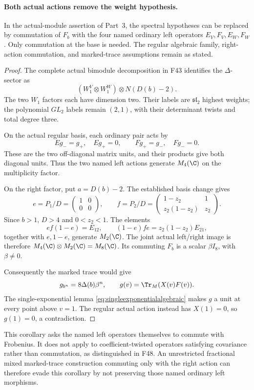 \documentclass[11pt,a4paper]{article}
\newcommand{\fid}[1]{\textsf{#1}}\newcommand{\gate}[1]{\textsf{#1}}
\theoremstyle{named}\newtheorem{finding}{Finding}[section]
\theoremstyle{definition}\newtheorem{definition}[finding]{Definition}
\theoremstyle{remark}\newtheorem{remark}[finding]{Remark}
\begin{document}
\paragraph{Both actual actions remove the weight hypothesis.}
In the actual-module assertion of Part~3, the spectral
hypotheses can be replaced by commutation of $F_b$
with the four named ordinary left operators
$E_V,F_V,E_W,F_W$.
Only commutation at the base is needed.
The regular algebraic family, right-action commutation,
and marked-trace assumptions remain as stated.

\begin{proof}
The complete actual bimodule decomposition in \fid{F43}
identifies the $\Delta$-sector as
\[
 (W_1^V\otimes W_1^W)\otimes N(D(b)-2).
\]
The two $W_1$ factors each have dimension two.
Their labels are $\mathfrak{sl}_2$ highest weights;
the polynomial $GL_2$ labels remain $(2,1)$, with
their determinant twists and total degree three.

On the actual regular basis, each ordinary pair acts by
\[
 Eg_-=g_+,\quad Eg_+=0,\qquad
 Fg_+=g_-,\quad Fg_-=0.
\]
These are the two off-diagonal matrix units, and their
products give both diagonal units.
Thus the two named left actions generate $M_4(\C)$
on the multiplicity factor.

On the right factor, put $a=D(b)-2$.
The established basis change gives
\[
 e=P_1/D=\begin{pmatrix}1&0\\0&0\end{pmatrix},\qquad
 f=P_2/D=
 \begin{pmatrix}1-z_2&1\\z_2(1-z_2)&z_2\end{pmatrix}.
\]
Since $b>1$, $D>4$ and $0<z_2<1$.
The elements
\[
 ef(1-e)=E_{12},\qquad
 (1-e)fe=z_2(1-z_2)E_{21},
\]
together with $e,1-e$, generate $M_2(\C)$.
The joint actual left/right image is therefore
$M_4(\C)\otimes M_2(\C)=M_8(\C)$.
Its commuting $F_b$ is a scalar $\beta I_8$, with
$\beta\ne0$.

Consequently the marked trace would give
\[
 g_{b^n}=8\Delta(b)\beta^n,\qquad
 g(v)=\Tr_M(X(v)F(v)).
\]
The single-exponential lemma
\eqref{eq:singleexponentialalgebraic}
makes $g$ a unit at every point above $v=1$.
The regular actual action instead has $X(1)=0$,
so $g(1)=0$, a contradiction.
\end{proof}

This corollary asks the named left operators themselves
to commute with Frobenius.
It does not apply to coefficient-twisted operators
satisfying covariance rather than commutation, as
distinguished in \fid{F48}.
An unrestricted fractional mixed marked-trace construction
commuting only with the right action can therefore evade
this corollary by not preserving those named ordinary
left morphisms.
\end{document}
